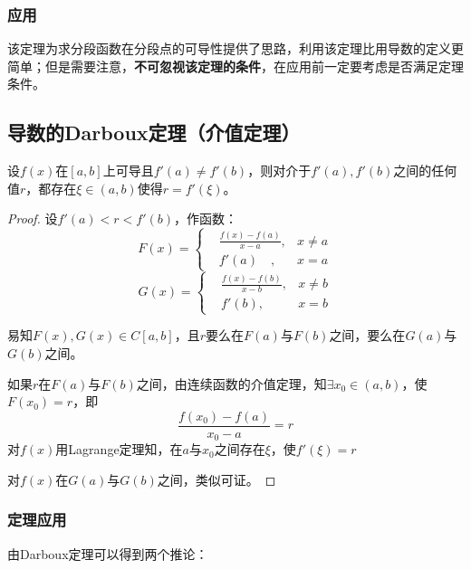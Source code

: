 \subsubsection{应用}
该定理为求分段函数在分段点的可导性提供了思路，利用该定理比用导数的定义更简单；但是需要注意，\textbf{不可忽视该定理的条件}，在应用前一定要考虑是否满足定理条件。

\subsection{导数的Darboux定理（介值定理）}\label{sec:4.6.4}

\begin{theorem}
	设$f(x)$在$[a,b]$上可导且$f'(a)\neq f'(b)$，则对介于$f'(a),f'(b)$之间的任何值$r$，都存在$\xi\in (a,b)$使得$r=f'(\xi)$。
\end{theorem}

\begin{proof}
	设$f'(a)<r<f'(b)$，作函数：
	\begin{equation*}
		F(x)=\left\{\begin{aligned}&\frac{f(x)-f(a)}{x-a},&x\neq a\\
		&f'(a)\quad,&x=a\end{aligned}\right.
	\end{equation*}
	\begin{equation*}
		G(x)=\left\{\begin{aligned}&\frac{f(x)-f(b)}{x-b},&x\neq b\\
		&f'(b),&x=b\end{aligned}\right.
	\end{equation*}
	
	易知$F(x),G(x)\in C[a,b]$，且$r$要么在$F(a)$与$F(b)$之间，要么在$G(a)$与$G(b)$之间。
	
	如果$r$在$F(a)$与$F(b)$之间，由连续函数的介值定理，知$\exists x_0\in (a,b)$，使$F(x_0)=r$，即
	\[\frac{f(x_0)-f(a)}{x_0-a}=r\]
	对$f(x)$用Lagrange定理知，在$a$与$x_0$之间存在$\xi$，使$f'(\xi)=r$
	
	对$f(x)$在$G(a)$与$G(b)$之间，类似可证。
\end{proof}

\subsubsection{定理应用}
由Darboux定理可以得到两个推论：

